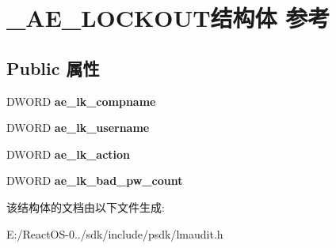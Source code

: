 \hypertarget{struct___a_e___l_o_c_k_o_u_t}{}\section{\+\_\+\+A\+E\+\_\+\+L\+O\+C\+K\+O\+U\+T结构体 参考}
\label{struct___a_e___l_o_c_k_o_u_t}
\subsection*{Public 属性}
\begin{DoxyCompactItemize}
\item 
\mbox{\label{struct___a_e___l_o_c_k_o_u_t_a4832e0f97deb0eab8a43b41ad71b99a9}} 
D\+W\+O\+RD {\bfseries ae\+\_\+lk\+\_\+compname}
\item 
\mbox{\label{struct___a_e___l_o_c_k_o_u_t_a966527951d56b8f393d37e4e9668cee3}} 
D\+W\+O\+RD {\bfseries ae\+\_\+lk\+\_\+username}
\item 
\mbox{\label{struct___a_e___l_o_c_k_o_u_t_aff8c45b74f2af1037216da586481f746}} 
D\+W\+O\+RD {\bfseries ae\+\_\+lk\+\_\+action}
\item 
\mbox{\label{struct___a_e___l_o_c_k_o_u_t_a757d8757a0ec18bbf50d6fceddebbf14}} 
D\+W\+O\+RD {\bfseries ae\+\_\+lk\+\_\+bad\+\_\+pw\+\_\+count}
\end{DoxyCompactItemize}


该结构体的文档由以下文件生成\+:\begin{DoxyCompactItemize}
\item 
E\+:/\+React\+O\+S-\/0../sdk/include/psdk/lmaudit.\+h\end{DoxyCompactItemize}
